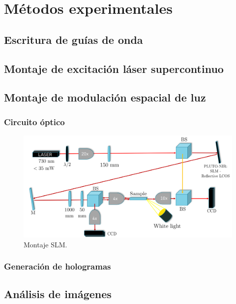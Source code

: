 \chapter{Métodos experimentales}

\section{Escritura de guías de onda}

\section{Montaje de excitación láser supercontinuo}

\section{Montaje de modulación espacial de luz}
\subsection{Circuito óptico}
\begin{figure}[H]
	\centering
	\includegraphics[width=\linewidth]{media/SLMsetup}
	\caption{Montaje SLM.}
\end{figure}
\subsection{Generación de hologramas}
\section{Análisis de imágenes}

